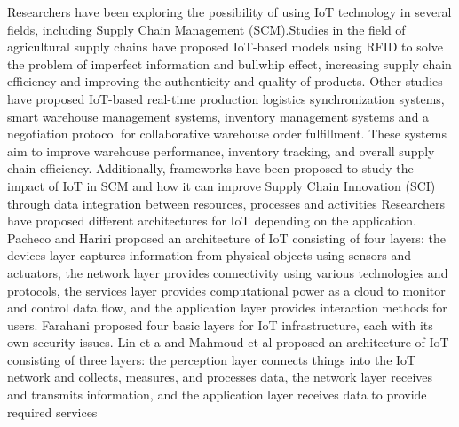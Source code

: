 \documentclass[12pt,letterpaper]{article}
\begin{document}
Researchers have been exploring the possibility of using IoT technology in several fields, including Supply Chain Management (SCM).\newline Studies in the field of agricultural supply chains have proposed IoT-based models using RFID to solve the problem of imperfect information and bullwhip effect, increasing supply chain efficiency and improving the authenticity and quality of products. \newline Other studies have proposed IoT-based real-time production logistics synchronization systems, smart warehouse management systems, inventory management systems and a negotiation protocol for collaborative warehouse order fulfillment. \newline These systems aim to improve warehouse performance, inventory tracking, and overall supply chain efficiency. Additionally, frameworks have been proposed to study the impact of IoT in SCM and how it can improve Supply Chain Innovation (SCI) through data integration between resources, processes and activities
Researchers have proposed different architectures for IoT depending on the application. \newline  Pacheco and Hariri  proposed an architecture of IoT consisting of four layers: the devices layer captures information from physical objects using sensors and actuators, the network layer provides connectivity using various technologies and protocols, the services layer provides computational power as a cloud to monitor and control data flow, and the application layer provides interaction methods for users. \newline Farahani proposed four basic layers for IoT infrastructure, each with its own security issues. \newline Lin et a  and Mahmoud et al  proposed an architecture of IoT consisting of three layers: the perception layer connects things into the IoT network and collects, measures, and processes data, the network layer receives and transmits information, and the application layer receives data to provide required services
\end{document}
